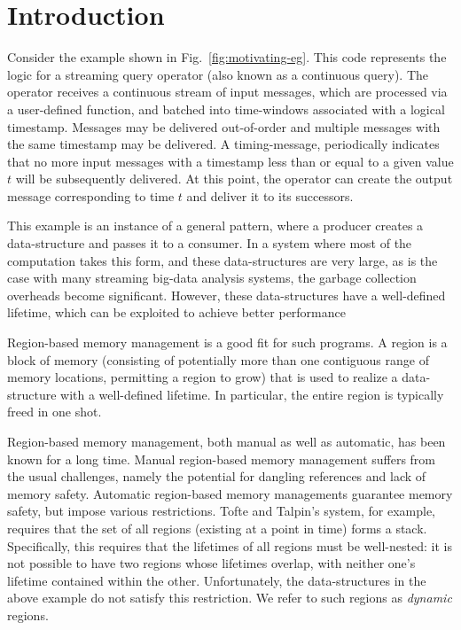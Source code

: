 \newcommand{\TODO}[1]{\textbf{TODO: #1}}
\newcommand{\eg}{\emph{e.g.}}

\section{Introduction}
\label{sec:introduction}

Consider the example shown in Fig.~\ref{fig:motivating-eg}.
This code represents the logic for a streaming query operator (also
known as a continuous query). The operator receives a continuous
stream of input messages, which are processed via a user-defined
function, and batched into time-windows associated with a logical
timestamp. Messages may be delivered out-of-order and multiple
messages with the same timestamp may be delivered. A timing-message,
periodically indicates that no more input messages with a timestamp
less than or equal to a given value $t$ will be subsequently
delivered. At this point, the operator can create the output message
corresponding to time $t$ and deliver it to its successors.



This example is an instance of a general pattern, where a producer
creates a data-structure and passes it to a consumer.  In a system
where most of the computation takes this form, and these
data-structures are very large, as is the case with many streaming
big-data analysis systems, the garbage collection overheads become
significant.
However, these data-structures have a well-defined lifetime, which can
be exploited to achieve better performance 

Region-based memory management is a good fit for such programs.
A region is a block of memory (consisting of potentially more than one contiguous
range of memory locations, permitting a region to grow) that is used to realize
a data-structure with a well-defined lifetime. In particular, the entire region
is typically freed in one shot.

Region-based memory management, both manual as well as automatic, has been known for
a long time. Manual region-based memory management suffers from the usual challenges,
namely the potential for dangling references and lack of memory safety. Automatic
region-based memory managements guarantee memory safety, but impose various restrictions.
Tofte and Talpin's system, for example, requires that the set of all regions (existing
at a point in time) forms a stack. Specifically, this requires that the lifetimes of
all regions must be well-nested: it is not possible to have two regions whose lifetimes
overlap, with neither one's lifetime contained within the other.
Unfortunately, the data-structures in the above example do not satisfy this restriction.
We refer to such regions as \emph{dynamic} regions.

